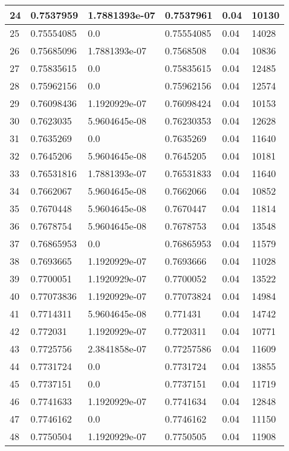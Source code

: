 \begin{longtable}{|l|l|l|l|l|l|}
24 & 0.7537959 & 1.7881393e-07 & 0.7537961 & 0.04 & 10130 \\ \hline 
25 & 0.75554085 & 0.0 & 0.75554085 & 0.04 & 14028 \\ \hline 
26 & 0.75685096 & 1.7881393e-07 & 0.7568508 & 0.04 & 10836 \\ \hline 
27 & 0.75835615 & 0.0 & 0.75835615 & 0.04 & 12485 \\ \hline 
28 & 0.75962156 & 0.0 & 0.75962156 & 0.04 & 12574 \\ \hline 
29 & 0.76098436 & 1.1920929e-07 & 0.76098424 & 0.04 & 10153 \\ \hline 
30 & 0.7623035 & 5.9604645e-08 & 0.76230353 & 0.04 & 12628 \\ \hline 
31 & 0.7635269 & 0.0 & 0.7635269 & 0.04 & 11640 \\ \hline 
32 & 0.7645206 & 5.9604645e-08 & 0.7645205 & 0.04 & 10181 \\ \hline 
33 & 0.76531816 & 1.7881393e-07 & 0.76531833 & 0.04 & 11640 \\ \hline 
34 & 0.7662067 & 5.9604645e-08 & 0.7662066 & 0.04 & 10852 \\ \hline 
35 & 0.7670448 & 5.9604645e-08 & 0.7670447 & 0.04 & 11814 \\ \hline 
36 & 0.7678754 & 5.9604645e-08 & 0.7678753 & 0.04 & 13548 \\ \hline 
37 & 0.76865953 & 0.0 & 0.76865953 & 0.04 & 11579 \\ \hline 
38 & 0.7693665 & 1.1920929e-07 & 0.7693666 & 0.04 & 11028 \\ \hline 
39 & 0.7700051 & 1.1920929e-07 & 0.7700052 & 0.04 & 13522 \\ \hline 
40 & 0.77073836 & 1.1920929e-07 & 0.77073824 & 0.04 & 14984 \\ \hline 
41 & 0.7714311 & 5.9604645e-08 & 0.771431 & 0.04 & 14742 \\ \hline 
42 & 0.772031 & 1.1920929e-07 & 0.7720311 & 0.04 & 10771 \\ \hline 
43 & 0.7725756 & 2.3841858e-07 & 0.77257586 & 0.04 & 11609 \\ \hline 
44 & 0.7731724 & 0.0 & 0.7731724 & 0.04 & 13855 \\ \hline 
45 & 0.7737151 & 0.0 & 0.7737151 & 0.04 & 11719 \\ \hline 
46 & 0.7741633 & 1.1920929e-07 & 0.7741634 & 0.04 & 12848 \\ \hline 
47 & 0.7746162 & 0.0 & 0.7746162 & 0.04 & 11150 \\ \hline 
48 & 0.7750504 & 1.1920929e-07 & 0.7750505 & 0.04 & 11908 \\ \hline 

\end{longtable}
